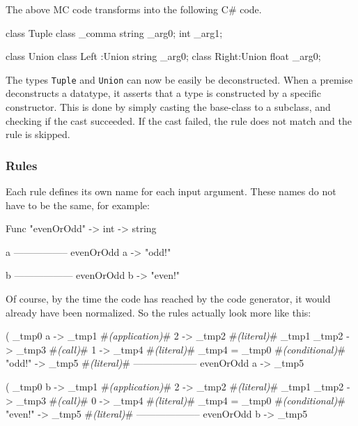 The above MC code transforms into the following C\# code.

\begin{CS}
class Tuple{}
class _comma { string _arg0; int _arg1;}

class Union{}
class Left :Union {string _arg0;}
class Right:Union {float  _arg0;}
\end{CS}

The types \verb|Tuple| and \verb|Union| can now be easily be deconstructed.
When a premise deconstructs a datatype, it asserts that a type is constructed by a specific constructor.
This is done by simply casting the base-class to a subclass, and checking if the cast succeeded.
If the cast failed, the rule does not match and the rule is skipped.

\subsubsection{Rules}\label{codegen_rules}

Each rule defines its own name for each input argument.
These names do not have to be the same, for example:

\begin{MC}
    Func "evenOrOdd" -> int -> string
    
    a%
    -----------------
    evenOrOdd a -> "odd!"

    b%
    ------------------
    evenOrOdd b -> "even!"
\end{MC}

Of course, by the time the code has reached by the code generator, it would already have been normalized.
So the rules actually look more like this:

\begin{MC}[escapeinside=\#\#]
    (%
    _tmp0 a -> _tmp1     #\textit{(application)}#
    2 -> _tmp2           #\textit{(literal)}#
    _tmp1 _tmp2 -> _tmp3 #\textit{(call)}#
    1 -> _tmp4           #\textit{(literal)}#
    _tmp4 = _tmp0        #\textit{(conditional)}#
    "odd!" -> _tmp5      #\textit{(literal)}#
    --------------------
    evenOrOdd a -> _tmp5
\end{MC}

\begin{MC}[escapeinside=\#\#]
    (%
    _tmp0 b -> _tmp1     #\textit{(application)}#
    2 -> _tmp2           #\textit{(literal)}#
    _tmp1 _tmp2 -> _tmp3 #\textit{(call)}#
    0 -> _tmp4           #\textit{(literal)}#
    _tmp4 = _tmp0        #\textit{(conditional)}#
    "even!" -> _tmp5     #\textit{(literal)}#
    --------------------
    evenOrOdd b -> _tmp5
\end{MC}


